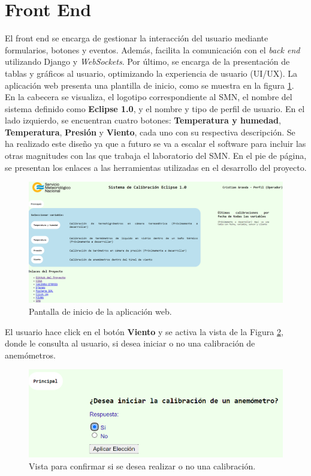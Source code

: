 \section{Front End}\label{sec:frontEnd}

El front end se encarga de gestionar la interacción del usuario mediante formularios, botones y eventos. Además, facilita la comunicación con el \textit{back end} utilizando Django y \textit{WebSockets}. Por último, se encarga de la presentación de tablas y gráficos al usuario, optimizando la experiencia de usuario (UI/UX). La aplicación web presenta una plantilla de inicio, como se muestra en la figura \ref{fig:index}. En la cabecera se visualiza, el logotipo correspondiente al SMN, el nombre del sistema definido como \textbf{Eclipse 1.0}, y el nombre y tipo de perfil de usuario. En el lado izquierdo, se encuentran cuatro botones: \textbf{Temperatura y humedad}, \textbf{Temperatura}, \textbf{Presión} y \textbf{Viento}, cada uno con su respectiva descripción. Se ha realizado este diseño ya que a futuro se va a escalar el software para incluir las otras magnitudes con las que trabaja el laboratorio del SMN. En el pie de página, se presentan los enlaces a las herramientas utilizadas en el desarrollo del proyecto.
\begin{figure}[H]
    \centering
    \includegraphics[width=1\linewidth]{Figuras/AplicacionWeb/frontend/index.png}
    \caption{Pantalla de inicio de la aplicación web.}
    \label{fig:index}
\end{figure}
El usuario hace click en el botón \textbf{Viento} y se activa la vista de la Figura \ref{fig:iniciarCalibViento}, donde le consulta al usuario, si desea iniciar o no una calibración de anemómetros.
\begin{figure}[H]
    \centering
    \includegraphics[width=0.7\linewidth]{Figuras/AplicacionWeb/frontend/iniciarCalibViento.png}
    \caption{Vista para confirmar si se desea realizar o no una calibración.}
    \label{fig:iniciarCalibViento}
\end{figure}
